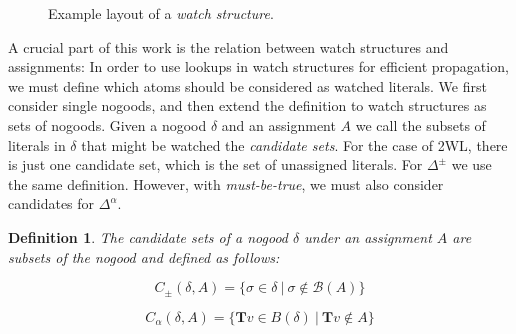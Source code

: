 \documentclass{vutinfth} %
\newtheorem{definition}{Definition}[chapter]
\newcommand{\mbt}{must-be-true\xspace}
\newcommand{\bass}{\mathcal{B}}
\newcommand{\ass}{A}
\newcommand{\bT}{\mathbf{T}}
\newcommand{\bX}{\mathbf{X}}
\newcommand{\cdpm}{C_\pm}
\newcommand{\cdal}{C_\alpha}
\newcommand{\dpm}{\Delta^\pm}
\newcommand{\dal}{\Delta^\alpha}
\newcommand{\bodyf}{B}
\newcommand{\bsgl}{\sigma}
\begin{document}
\begin{figure}
  \centering
{}
  \caption{Example layout of a \emph{watch structure}.}
  \label{fig:watches} %
\end{figure}

A crucial part of this work is the relation between watch structures and assignments: In order to use lookups in watch structures for efficient propagation, we must define which atoms should be considered as watched literals. We first consider single nogoods, and then extend the definition to watch structures as sets of nogoods. Given a nogood $\delta$ and an assignment $\ass$ we call the subsets of literals in $\delta$ that might be watched the \emph{candidate sets}. For the case of 2WL, there is just one candidate set, which is the set of unassigned literals. For $\dpm$ we use the same definition. However, with \emph{\mbt}, we must also consider candidates for $\dal$.


\begin{definition}
The \emph{candidate sets} of a nogood $\delta$ under an assignment $A$ are subsets of the nogood  and defined as follows:

$$\cdpm(\delta, A) = \{\bsgl \in \delta \ | \ \bsgl \not \in \bass(\ass) \}$$

$$\cdal(\delta, A) = \{ \bT v \in \bodyf(\delta) \ | \ \bT v \not \in \ass \}$$
\end{definition}
\end{document}
